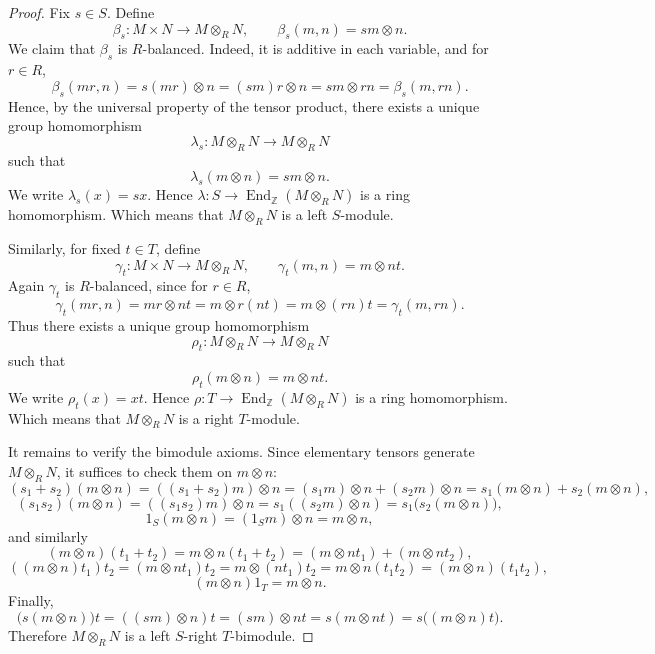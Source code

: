 \begin{proof}
    Fix $s\in S$. Define
    \[
        \beta_s:M\times N\to M\otimes_R N,
        \qquad
        \beta_s(m,n)=sm\otimes n.
    \]
    We claim that $\beta_s$ is $R$-balanced. Indeed, it is additive in each variable, and for $r\in R$,
    \[
        \beta_s(mr,n)=s(mr)\otimes n=(sm)r\otimes n=sm\otimes rn=\beta_s(m,rn).
    \]
    Hence, by the universal property of the tensor product, there exists a unique group homomorphism
    \[
        \lambda_s:M\otimes_R N\to M\otimes_R N
    \]
    such that
    \[
        \lambda_s(m\otimes n)=sm\otimes n.
    \]
    We write $\lambda_s(x)=sx$. Hence $ \lambda: S\to \operatorname{End}_{\mathbb Z}(M\otimes_R N)$ is a ring homomorphism. Which means that $M\otimes_R N$ is a left $S$-module.

    Similarly, for fixed $t\in T$, define
    \[
        \gamma_t:M\times N\to M\otimes_R N,
        \qquad
        \gamma_t(m,n)=m\otimes nt.
    \]
    Again $\gamma_t$ is $R$-balanced, since for $r\in R$,
    \[
        \gamma_t(mr,n)=mr\otimes nt=m\otimes r(nt)=m\otimes (rn)t=\gamma_t(m,rn).
    \]
    Thus there exists a unique group homomorphism
    \[
        \rho_t:M\otimes_R N\to M\otimes_R N
    \]
    such that
    \[
        \rho_t(m\otimes n)=m\otimes nt.
    \]
    We write $\rho_t(x)=xt$. Hence $ \rho: T\to \operatorname{End}_{\mathbb Z}(M\otimes_R N)$ is a ring homomorphism. Which means that $M\otimes_R N$ is a right $T$-module.

    It remains to verify the bimodule axioms. Since elementary tensors generate $M\otimes_R N$, it suffices to check them on $m\otimes n$:
    \[
        (s_1+s_2)(m\otimes n)=((s_1+s_2)m)\otimes n
        =(s_1m)\otimes n+(s_2m)\otimes n
        =s_1(m\otimes n)+s_2(m\otimes n),
    \]
    \[
        (s_1s_2)(m\otimes n)=((s_1s_2)m)\otimes n
        =s_1((s_2m)\otimes n)=s_1\bigl(s_2(m\otimes n)\bigr),
    \]
    \[
        1_S(m\otimes n)=(1_Sm)\otimes n=m\otimes n,
    \]
    and similarly
    \[
        (m\otimes n)(t_1+t_2)=m\otimes n(t_1+t_2)
        =(m\otimes nt_1)+(m\otimes nt_2),
    \]
    \[
        ((m\otimes n)t_1)t_2
        =(m\otimes nt_1)t_2
        =m\otimes (nt_1)t_2
        =m\otimes n(t_1t_2)
        =(m\otimes n)(t_1t_2),
    \]
    \[
        (m\otimes n)1_T=m\otimes n.
    \]
    Finally,
    \[
        \bigl(s(m\otimes n)\bigr)t=((sm)\otimes n)t=(sm)\otimes nt
        =s(m\otimes nt)=s\bigl((m\otimes n)t\bigr).
    \]
    Therefore $M\otimes_R N$ is a left $S$-right $T$-bimodule.
\end{proof}

